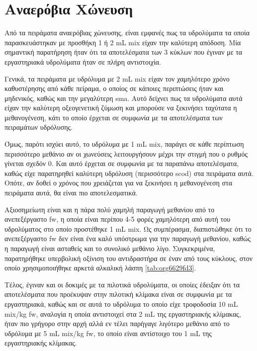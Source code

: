 \documentclass[11pt]{report}
\begin{document}
\section{Αναερόβια Χώνευση}
\label{sec:org0f2c377}
Από τα πειράματα αναερόβιας χώνευσης, είναι εμφανές πως τα υδρολύματα τα οποία παρασκευάστηκαν με προσθήκη 1 ή 2 mL \acrshort{mix} είχαν την καλύτερη απόδοση. Μία σημαντική παρατήρηση ήταν ότι τα αποτελέσματα των 3 κύκλων που έγιναν με τα εργαστηριακά υδρολύματα ήταν σε πλήρη αντιστοιχία.

Γενικά, τα πειράματα με υδρόλυμα με 2 mL \acrshort{mix} είχαν τον χαμηλότερο χρόνο καθυστέρησης από κάθε πείραμα, ο οποίος σε κάποιες περιπτώσεις ήταν και μηδενικός, καθώς και την μεγαλύτερη \acrshort{sma}. Αυτό δείχνει πως τα υδρολύματα αυτά είχαν την καλύτερη οξεογενετική ζύμωση και μπορούσε να ξεκινήσει ταχύτατα η μεθανογένεση, κάτι το οποίο έρχεται σε συμφωνία με τα αποτελέσματα των πειραμάτων υδρόλυσης.

Όμως, παρότι ισχύει αυτό, το υδρόλυμα με 1 mL \acrshort{mix}, παράγει σε κάθε περίπτωση περισσότερο μεθάνιο αν οι χωνεύσεις λειτουργήσουν μέχρι την στιγμή που ο ρυθμός γίνεται σχεδόν 0. Και αυτό έρχεται σε συμφωνία με τα παραπάνω αποτελέσματα, καθώς είχε παρατηρηθεί καλύτερη υδρόλυση (περισσότερο \acrshort{scod}) στα πειράματα αυτά. Οπότε, αν δοθεί ο χρόνος που χρειάζεται για να ξεκινήσει η μεθανογένεση στα πειράματα αυτά, θα είναι πιο αποτελεσματικά.

Αξιοσημείωτη είναι και η πάρα πολύ χαμηλή παραγωγή μεθανίου από το ανεπεξέργαστο \acrshort{fw}, η οποία είναι περίπου 4-5 φορές χαμηλότερη από αυτή του υδρολύματος στο οποίο προστέθηκε 1 mL \acrshort{mix}. Ως συμπέρασμα, διαπιστώθηκε ότι το ανεπεξέργαστο \acrshort{fw} δεν είναι ένα καλό υπόστρωμα για την παραγωγή μεθανίου, καθώς η παραγωγή είναι ασταθείς και το συνολικό μεθάνιο λίγο. Συγκεκριμένα, παρατηρήθηκε υπερβολική οξίνιση του αντιδραστήρα σε έναν από τους κύκλους, στον οποίο χρησιμοποιήθηκε αρκετά αλκαλική λάσπη \ref{tab:org6629fd3}.

Τέλος, έγιναν και οι δοκιμές με τα πιλοτικά υδρολύματα, οι οποίες έδειξαν ότι τα αποτελέσματα που προέκυψαν στην πιλοτική κλίμακα είναι σε συμφωνία με τα εργαστηριακά, καθώς και σε αυτά το υδρόλυμα το οποίο είχε τροφοδοσία 10 mL \acrshort{mix}/kg \acrshort{fw}, αναλογία η οποία αντιστοιχεί στα 2 mL της εργαστηριακής κλίμακας, ήταν πιο γρήγορο στην αρχή αλλά εν τέλει παρήγαγε λιγότερο μεθάνιο από το υδρόλυμα με 5 mL \acrshort{mix}/kg \acrshort{fw}, το οποίο είναι αντίστοιχο του 1 mL της εργαστηριακής κλίμακας.
\end{document}

